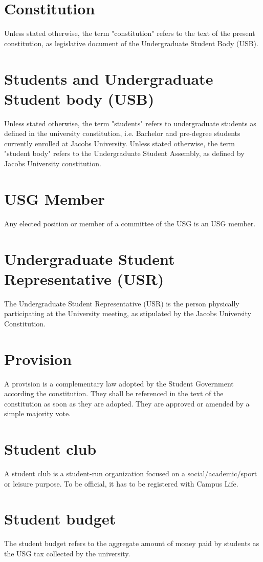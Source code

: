 \documentclass[12pt]{LaTeX_Misc/constitution}
\begin{document}
\section{Constitution}
Unless stated otherwise, the term "constitution" refers to the text of the present constitution, as legislative document of the Undergraduate Student Body (USB).
 
\section{Students and Undergraduate Student body (USB)}
\label{studentbody}
 Unless stated otherwise, the term "students" refers to undergraduate students as defined in the university constitution, i.e. Bachelor and pre-degree students currently enrolled at Jacobs University. Unless stated otherwise, the term "student body" refers to the Undergraduate Student Assembly, as defined by Jacobs University constitution.

\section{USG Member}
Any elected position or member of a committee of the USG is an USG member.

\section{Undergraduate Student Representative (USR)}
\label{USRdef}
The Undergraduate Student Representative (USR) is the person physically participating at the University meeting, as stipulated by the Jacobs University Constitution.


\section{Provision}
A provision is a complementary law adopted by the Student Government according the constitution. They shall be referenced in the text of the constitution as soon as they are adopted. They are approved or amended by a simple majority vote.

\section{Student club}
A student club is a student-run organization focused on a social/academic/sport or leisure purpose. To be official, it has to be registered with Campus Life.

\section{Student budget}
The student budget refers to the aggregate amount of money paid by students as the USG tax collected by the university.
\end{document}
